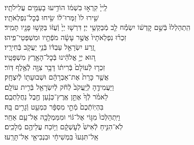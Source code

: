 \documentclass[twoside, openany, parskip=half, 11pt]{book}
\begin{document}
\begin{narrow}
לַֽייָ֙ קִרְא֣וּ בִשְׁמ֔וֹ \hfill
הוֹדִ֥יעוּ בָעַמִּ֖ים עֲלִילֹתָֽיו׃\\
שִׁ֤ירוּ לוֹ֙ זַמְּרוּ־ל֔וֹ \hfill שִׂ֖יחוּ בְּֿכׇל־נִפְלְאֹתָֽיו׃\\
הִֽתְהַלְלוּ֙ בְּֿשֵׁ֣ם קׇדְשׁ֔וֹ \hfill יִשְׂמַ֕ח לֵ֖ב מְֿבַקְשֵׁ֥י יְיָ׃
דִּרְשׁ֤וּ יְיָ֙ וְֿעֻזּ֔וֹ \hfill בַּקְּשׁ֥וּ פָנָ֖יו תָּמִֽיד׃\\
זִכְר֗וּ נִפְלְאֹתָיו֙ אֲשֶׁ֣ר עָשָׂ֔ה \hfill מֹפְֿתָ֖יו וּמִשְׁפְּטֵי־פִֽיהוּ׃\\
זֶ֚רַע יִשְׂרָאֵ֣ל עַבְדּ֔וֹ \hfill בְּֿנֵ֥י יַעֲקֹ֖ב בְּֿחִירָֽיו׃\\
ה֚וּא יְיָ֣ אֱלֹהֵ֔ינוּ \hfill בְּֿכׇל־הָאָ֖רֶץ מִשְׁפָּטָֽיו׃\\
זִכְר֤וּ לְֿעוֹלָם֙ בְּֿרִית֔וֹ \hfill דָּבָ֥ר צִוָּ֖ה לְֿאֶ֥לֶף דּֽוֹר׃\\
אֲשֶׁ֤ר כָּרַת֙ אֶת־אַבְרָהָ֔ם \hfill וּשְׁבוּעָת֖וֹ לְֿיִצְחָֽק׃\\
וַיַּעֲמִידֶ֤הָ לְֿיַֽעֲקֹב֙ לְֿחֹ֔ק \hfill לְֿיִשְׂרָאֵ֖ל בְּֿרִ֥ית עוֹלָֽם׃\\
לֵאמֹ֗ר לְֿךָ֙ אֶתֵּ֣ן אֶֽרֶץ־כְּנָ֔עַן \hfill חֶ֖בֶל נַחֲלַתְכֶֽם׃\\
בִּהְיֽוֹתְֿכֶם֙ מְֿתֵ֣י מִסְפָּ֔ר \hfill כִּמְעַ֖ט וְֿגָרִ֥ים בָּֽהּ׃\\
וַיִּֽתְהַלְּכוּ֙ מִגּ֣וֹי אֶל־גּ֔וֹי \hfill וּמִמַּמְלָכָ֖ה אֶל־עַ֥ם אַחֵֽר׃\\
לֹֽא־הִנִּ֤יחַ לְֿאִישׁ֙ לְֿעׇשְׁקָ֔ם \hfill וַיּ֥וֹכַח עֲלֵיהֶ֖ם מְֿלָכִֽים׃\\
אַֽל־תִּגְּעוּ֙ בִּמְשִׁיחָ֔י \hfill וּבִנְבִיאַ֖י אַל־תָּרֵֽעוּ׃\\


\end{narrow}
\end{document}
